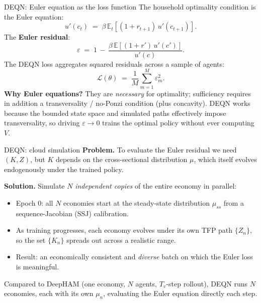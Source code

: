 \begin{frame}{DEQN: Euler equation as the loss function}
The household optimality condition is the Euler equation:
\[
u'(c_t) \;=\; \beta\,\mathbb{E}_t\!\left[(1+r_{t+1})\,u'(c_{t+1})\right].
\]
\medskip
The \textbf{Euler residual}:
\[
\varepsilon \;=\; 1 \,-\, \frac{\beta\,\mathbb{E}\!\left[(1+r')\,u'(c')\right]}{u'(c)}.
\]
\medskip
The DEQN loss aggregates squared residuals across a sample of agents:
\[
\mathcal{L}(\theta) \;=\; \frac{1}{M}\sum_{m=1}^{M} \varepsilon_m^2.
\]
\medskip
\textbf{Why Euler equations?} They are \emph{necessary} for optimality; sufficiency requires in addition a transversality / no-Ponzi condition (plus concavity). DEQN works because the bounded state space and simulated paths effectively impose transversality, so driving $\varepsilon\to 0$ trains the optimal policy without ever computing $V$.
\end{frame}

\begin{frame}{DEQN: cloud simulation}
\textbf{Problem.} To evaluate the Euler residual we need $(K, Z)$, but $K$ depends on the cross-sectional distribution $\mu$, which itself evolves endogenously under the trained policy.
\medskip

\textbf{Solution.} Simulate $N$ \emph{independent copies} of the entire economy in parallel:
\medskip
\begin{itemize}
\item Epoch 0: all $N$ economies start at the steady-state distribution $\mu_{ss}$ from a sequence-Jacobian (SSJ) calibration.
\item As training progresses, each economy evolves under its own TFP path $\{Z_n\}$, so the set $\{K_n\}$ spreads out across a realistic range.
\item Result: an economically consistent and \emph{diverse} batch on which the Euler loss is meaningful.
\end{itemize}
\medskip
Compared to DeepHAM (one economy, $N$ agents, $T_v$-step rollout), DEQN runs $N$ economies, each with its own $\mu_n$, evaluating the Euler equation directly each step.
\end{frame}

